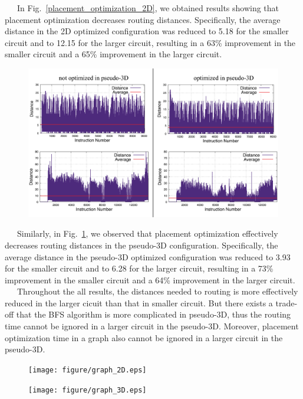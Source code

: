 \documentclass[a4paper,11pt]{ltjsarticle}
\begin{document}
{    \ \ \ In Fig.~\ref{placement_optimization_2D}, we obtained results showing that placement optimization decreases routing distances. Specifically, the average distance in the 2D optimized configuration was reduced to 5.18 for the smaller circuit and to 12.15 for the larger circuit, resulting in a 63\% improvement in the smaller circuit and a 65\% improvement in the larger circuit.
    \clearpage
    
    \begin{figure}[h]
        \centering
        \includegraphics[scale=0.5]{figure/placement_optimization_3D.eps}
        \vspace{-20pt}\caption{}
        \label{placement_optimization_3D}
    \end{figure}

    \ \ \ Similarly, in Fig.~\ref{placement_optimization_3D}, we observed that placement optimization effectively decreases routing distances in the pseudo-3D configuration. Specifically, the average distance in the pseudo-3D optimized configuration was reduced to 3.93 for the smaller circuit and to 6.28 for the larger circuit, resulting in a 73\% improvement in the smaller circuit and a 64\% improvement in the larger circuit.\\
    \ \ \ Throughout the all results, the distances needed to routing is more effectively reduced in the larger cicuit than that in smaller circuit. But there exists a trade-off that the BFS algorithm is more complicated in pseudo-3D, thus the routing time cannot be ignored in a larger circuit in the pseudo-3D. Moreover, placement optimization time in a graph also cannot be ignored in a larger circuit in the pseudo-3D.
    \clearpage

    \begin{figure}[h]
        \centering
        \texttt{[image: figure/graph\_2D.eps]}
        \vspace{0pt}\caption{}
        \label{graph_2D}
        \texttt{[image: figure/graph\_3D.eps]}
        \vspace{-10pt}\caption{}
        \label{graph_3D}
    \end{figure}
}
\end{document}
